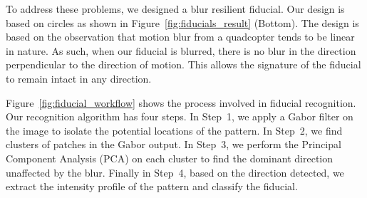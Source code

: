To address these problems, we designed a blur resilient fiducial.
Our design is based on circles as shown in Figure~\ref{fig:fiducials_result}
(Bottom). The design is based on the observation that motion blur from a
quadcopter tends to be linear in nature. As such, when our fiducial is blurred,
there is no blur in the direction perpendicular to the direction of motion.
This allows the signature of the fiducial to remain intact in any direction.

Figure~\ref{fig:fiducial_workflow} shows the process involved in fiducial
recognition. Our recognition algorithm has four steps. In Step~1, we apply a Gabor
filter on the image to isolate the potential locations of the pattern.  In
Step~2, we find clusters of patches in the Gabor output.  In Step~3, we perform
the Principal Component Analysis (PCA) on each cluster to find the dominant
direction unaffected by the blur.  Finally in Step~4, based on the direction
detected, we extract the intensity profile of the pattern and classify the
fiducial.

